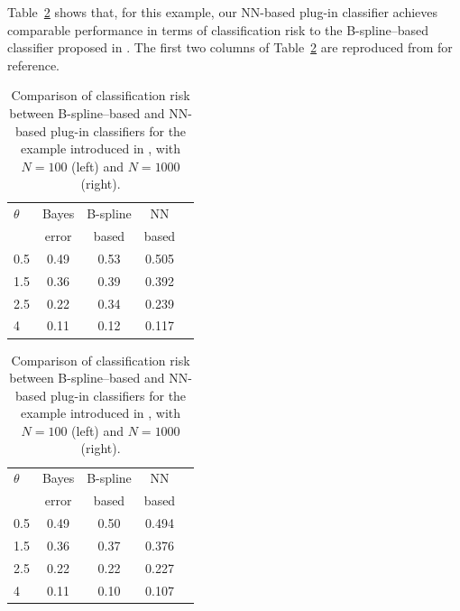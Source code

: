 \documentclass{article}
\theoremstyle{plain}
\theoremstyle{definition}
\theoremstyle{remark}
\begin{document}
Table~\ref{table:cos-example} shows that, for this example, our NN-based plug-in classifier achieves comparable performance in terms of classification risk to the B-spline–based classifier proposed in \citet{Denis2024}. The first two columns of Table~\ref{table:cos-example} are reproduced from \citet[Table 1]{Denis2024} for reference. 
\begin{table}[th]
  \begin{minipage}{0.5\linewidth}
      \begin{sc}
        \begin{tabular}{lcccr}
          \toprule
          $\theta$  & Bayes        &  B-spline       & NN \\
          &error & based & based\\
          \midrule
          0.5    & 0.49 & 0.53 &  0.505\\
          1.5 & 0.36 & 0.39 & 0.392 \\
          2.5    & 0.22 & 0.34 & 0.239 \\
          4    & 0.11 & 0.12 &   0.117    \\
          \bottomrule
        \end{tabular}
      \end{sc}
  \end{minipage}
    \begin{minipage}{0.5\linewidth}
      \begin{sc}
        \begin{tabular}{lcccr}
          \toprule
          $\theta$  & Bayes        &  B-spline       & NN \\
          &error & based & based\\
          \midrule
          0.5   & 0.49 & 0.50 & 0.494 \\
          1.5 & 0.36 & 0.37 & 0.376 \\
          2.5    & 0.22 & 0.22 & 0.227 \\
          4    & 0.11 & 0.10 &   0.107      \\
          \bottomrule
        \end{tabular}
      \end{sc}
  \end{minipage}
  \smallskip
\caption{Comparison of classification risk between B-spline--based and NN-based plug-in classifiers for the example introduced in \citet{Denis2024}, with $N=100$ (left) and $N=1000$ (right).}
  \label{table:cos-example}
\end{table}
\end{document}
